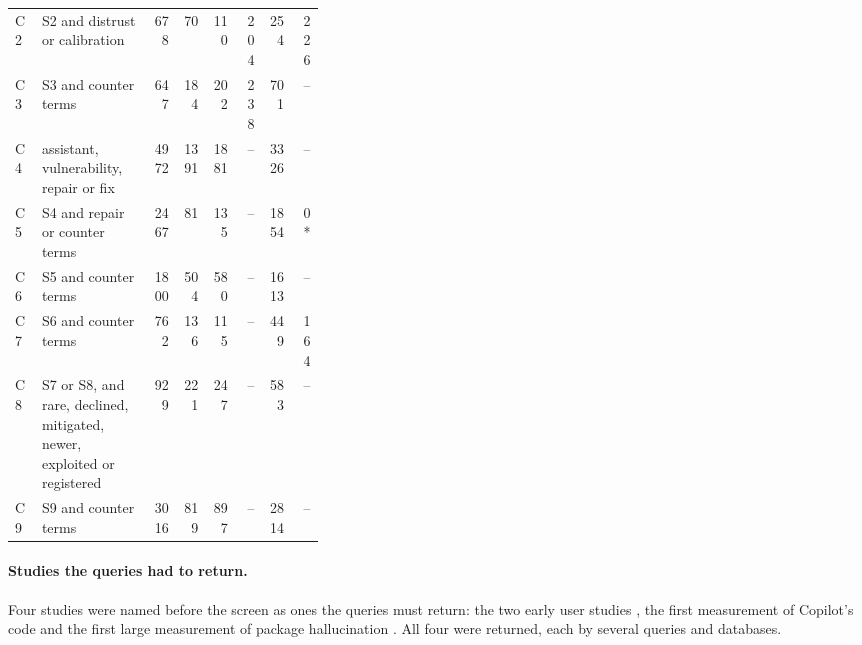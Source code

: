 \begin{table}[tbp]
\begin{sidecaption}
\begin{tabular}{@{}lp{0.36\linewidth}rrrrrr@{}}
      C2 & S2 and distrust or calibration & 678 & 70 & 110 & 204 & 254 & 226 \\
      C3 & S3 and counter terms & 647 & 184 & 202 & 238 & 701 & -- \\
      C4 & assistant, vulnerability, repair or fix & 4972 & 1391 & 1881 & -- & 3326 & -- \\
      C5 & S4 and repair or counter terms & 2467 & 81 & 135 & -- & 1854 & 0* \\
      C6 & S5 and counter terms & 1800 & 504 & 580 & -- & 1613 & -- \\
      C7 & S6 and counter terms & 762 & 136 & 115 & -- & 449 & 164 \\
      C8 & S7 or S8, and rare, declined, mitigated, newer, exploited or registered & 929 & 221 & 247 & -- & 583 & -- \\
      C9 & S9 and counter terms & 3016 & 819 & 897 & -- & 2814 & -- \\
      \bottomrule
    \end{tabular}
  \end{sidecaption}
\end{table}

\paragraph{Studies the queries had to return.}
Four studies were named before the screen as ones the queries must return:
the two early user studies \autocite{Perry2023Users,Sandoval2023LostC}, the
first measurement of Copilot's code \autocite{Pearce2022Asleep} and the
first large measurement of package hallucination
\autocite{Spracklen2025Package}.
All four were returned, each by several queries and databases.

